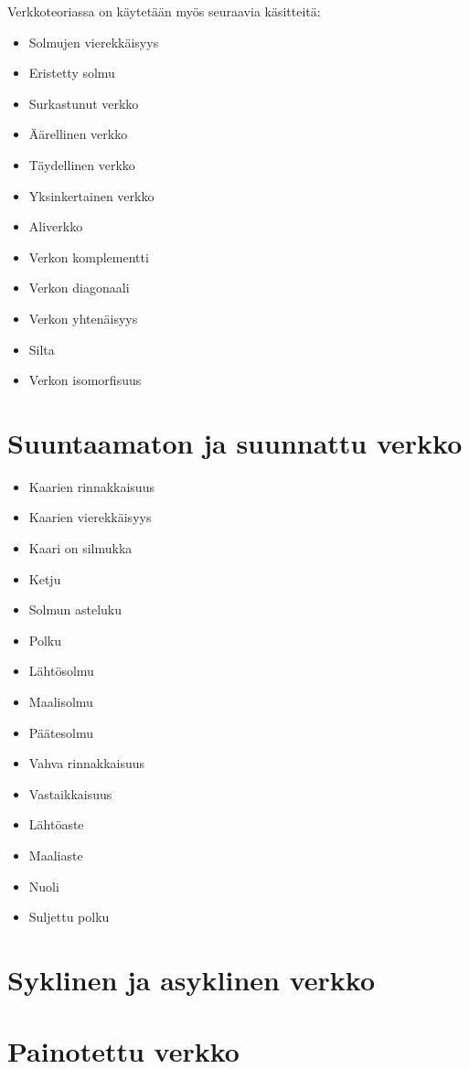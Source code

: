 Verkkoteoriassa on käytetään myös seuraavia käsitteitä:
\begin{itemize}
  \item Solmujen vierekkäisyys
  \item Eristetty solmu
  \item Surkastunut verkko
  \item Äärellinen verkko
  \item Täydellinen verkko
  \item Yksinkertainen verkko
  \item Aliverkko
  \item Verkon komplementti
  \item Verkon diagonaali
  \item Verkon yhtenäisyys
  \item Silta
  \item Verkon isomorfisuus
\end{itemize}

\section{Suuntaamaton ja suunnattu verkko}

\begin{itemize}
  \item Kaarien rinnakkaisuus
  \item Kaarien vierekkäisyys
  \item Kaari on silmukka
  \item Ketju
  \item Solmun asteluku
  \item Polku
  \item Lähtösolmu
  \item Maalisolmu
  \item Päätesolmu
  \item Vahva rinnakkaisuus
  \item Vastaikkaisuus
  \item Lähtöaste
  \item Maaliaste
  \item Nuoli
  \item Suljettu polku
\end{itemize}

\section{Syklinen ja asyklinen verkko}

\section{Painotettu verkko}

